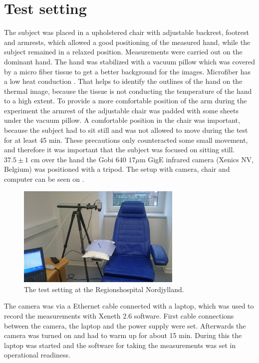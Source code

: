 \section{Test setting}

The subject was placed in a upholstered chair with adjustable backrest, footrest and armrests, which allowed a good positioning of the measured hand, while the subject remained in a relaxed position. Measurements were carried out on the dominant hand. The hand was stabilized with a vacuum pillow which was covered by a micro fiber tissue to get a better background for the images. Microfiber has a low heat conduction \cite{schacher2000}. That helps to identify the outlines of the hand on the thermal image, because the tissue is not conducting the temperature of the hand to a high extent. To provide a more comfortable position of the arm during the experiment the armrest of the adjustable chair was padded with some sheets under the vacuum pillow. A comfortable position in the chair was important, because the subject had to sit still and was not allowed to move during the test for at least 45 min. These precautions only counteracted some small movement, and therefore it was important that the subject was focused on sitting still. 
$37.5\pm 1$ cm over the hand the Gobi $640$ $17\mu$m GigE infrared camera (Xenics NV, Belgium) was positioned with a tripod. The setup with camera, chair and computer can be seen on . 


\begin{figure}[H]
	\includegraphics[width=0.7\textwidth]{figures/setting}
	\caption{The test setting at the Regionshospital Nordjylland.}
	\label{fig:setting}
\end{figure}

The camera was via a Ethernet cable connected with a laptop, which was used to record the measurements with Xeneth 2.6 software. 
First cable connections between the camera, the laptop and the power supply were set. Afterwards the camera was turned on and had to warm up for about 15 min. During this the laptop was started and the software for taking the measurements was set in operational readiness.

